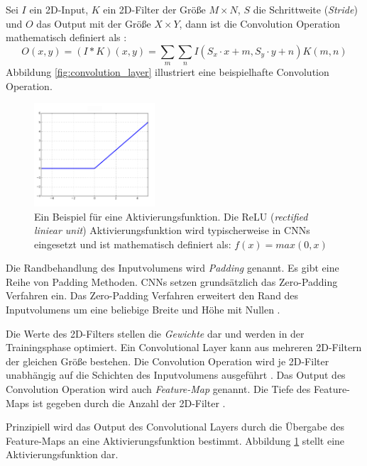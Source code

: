 Sei $I$ ein 2D-Input, $K$ ein 2D-Filter der Größe $M \times N$, $S$ die Schrittweite (\textit{Stride}) und $O$ das Output mit der Größe $X \times Y$, dann ist die Convolution Operation mathematisch definiert als \cite{goodfellowDeepLearning2016}:
\begin{equation}
	\label{eq:convolution}
	O(x,y) = (I * K)(x,y) = \sum_{m}\sum_{n}I(S_x \cdot x+m, S_y \cdot y+n)K(m,n)
\end{equation}
Abbildung \ref{fig:convolution_layer} illustriert eine beispielhafte Convolution Operation.
\begin{figure}
	\centering
	\includegraphics[width=0.4\textwidth]{images/ann_conv/ReLU.png}
	\caption{Ein Beispiel für eine Aktivierungsfunktion. Die ReLU (\textit{rectified liniear unit}) Aktivierungsfunktion wird typischerweise in CNNs eingesetzt und ist mathematisch definiert als: $f(x) = max(0,x)$ \cite{goodfellowDeepLearning2016} }
	\label{fig:relu}
\end{figure}

Die Randbehandlung des Inputvolumens wird \textit{Padding} genannt. Es gibt eine Reihe von Padding Methoden. CNNs setzen grundsätzlich das Zero-Padding Verfahren ein. Das Zero-Padding Verfahren erweitert den Rand des Inputvolumens um eine beliebige Breite und Höhe mit Nullen \cite{johnsonCS231nConvolutionalNeurala}. 

Die Werte des 2D-Filters stellen die \textit{Gewichte} dar und werden in der Trainingsphase optimiert. Ein Convolutional Layer kann aus mehreren 2D-Filtern der gleichen Größe bestehen. Die Convolution Operation wird je 2D-Filter unabhängig auf die Schichten des Inputvolumens ausgeführt \cite{johnsonCS231nConvolutionalNeurala}. Das Output des Convolution Operation wird auch \textit{Feature-Map} genannt. Die Tiefe des Feature-Maps ist gegeben durch die Anzahl der 2D-Filter \cite{yamashitaConvolutionalNeuralNetworks2018}.

Prinzipiell wird das Output des Convolutional Layers durch die Übergabe des Feature-Maps an eine Aktivierungsfunktion bestimmt. Abbildung \ref{fig:relu} stellt eine Aktivierungsfunktion dar.

